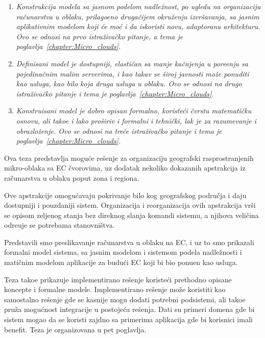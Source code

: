 \begin{enumerate}[start=1,label={(\bfseries \arabic*)}]
	\item \textit{Konstrukcija modela sa jasnom podelom nadle\v znost, po ugledu na organizaciju ra\v cunarstva u oblaku, prilago\dj eno druga\v cijem okru\v zenju izvr\v savanja, sa jasnim aplikativnim modelom koji \'ce mo\'c i da iskoristi novu, adaptoranu arhitekturu. Ovo se odnosi na prvo istra\v ziva\v cko pitanje, a tema je poglavlja~\ref{chapter:Micro_clouds}.}
	\item \textit{Definisani model je dostupniji, elasti\v can sa manje ka\v cnjenja u pore\dj enju sa pojedina\v cnim malim serverima, i kao takav se \v siroj javnosti mo\v ze ponuditi kao usluga, kao bilo koja druga usluga u oblaku. Ovo se odnosi na drugo istra\v ziva\v cko pitanje i tema je poglavlja~\ref{chapter:Micro_clouds}.}
	\item \textit{Konstruisani model je dobro opisan formalno, koriste\'ci \v cvrstu matemati\v cku osnovu, ali tako\dj e i lako pro\v siriv i formalni i tehni\v cki, lak je za razumevanje i obrazlo\v zenje. Ovo se odnosi na tre\'ce istra\v ziva\v cko pitanje i tema je poglavlja~\ref{chapter:Micro_clouds}.}
\end{enumerate}

\noindent
Ova teza predstavlja mogu\'ce re\v senje za organizaciju geografski rasprostranjenih mikro-oblaka sa EC čvorovima, uz dodatak nekoliko dokazanih apstrakcija iz ra\v cunarstva u oblaku poput zona i regiona.

Ove apstrakcije omogu\'cavaju pokrivanje bilo kog geografskog područja i daju dostupniji i pouzdaniji sistem. Organizacija i reorganizacija ovih apstrakcija vr\v si se opisom zeljenog stanja bez direknog slanja komandi sistemu, a njihova veli\v cina odre\dj uje se potrebama stanovni\v stva.

Predstavili smo preslikavanje ra\v cunarstva u oblaku na EC, i uz to smo prikazali formalni model sistema, sa jasnim modelom i sistemom podela nadle\v znosti i mati\v cnim modelom aplikacije za budu\'ci EC koji bi bio ponu\dj en kao usluga. 

Teza tako\dj e prikazuje implementirano re\v senje koriste\'ci prethodno opisane koncepte i formalne modele. Implementirano re\v senje mo\v ze koristiti kao samostalno re\v senje gde se kasnije mogu dodati potrebni podsistemi, ali tako\dj e pru\v za mogu\'cnost integracije u postoje\'ca re\v senja. Dati su primeri domena gde bi sistem mogao da se koristi zajdno sa primerima aplikacija gde bi korisnici imali benefit. Teza je organizovana u pet poglavlja.

